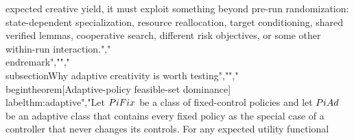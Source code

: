 {{{expected creative yield, it must exploit something beyond pre-run randomization: state-dependent specialization, resource reallocation, target conditioning, shared verified lemmas, cooperative search, different risk objectives, or some other within-run interaction.","\\end{remark}","","\\subsection{Why adaptive creativity is worth testing}","","\\begin{theorem}[Adaptive-policy feasible-set dominance]\\label{thm:adaptive}","Let $\\PiFix$ be a class of fixed-control policies and let $\\PiAd$ be an adaptive class that contains every fixed policy as the special case of a controller that never changes its controls. For any expected utility functional}}}

